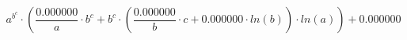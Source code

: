 \documentclass{article}
\begin{document}
$$a^{b^{c}} \cdot (\frac{0.000000}{a} \cdot b^{c} + b^{c} \cdot (\frac{0.000000}{b} \cdot c + 0.000000 \cdot ln(b)) \cdot ln(a)) + 0.000000$$
\end{document}
